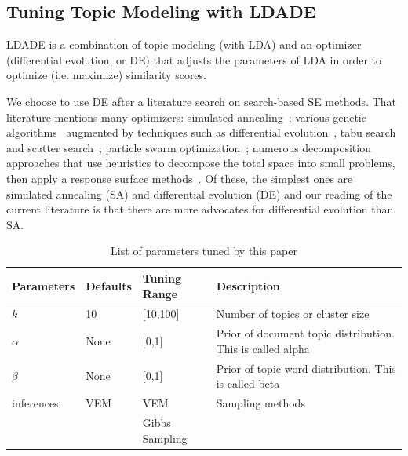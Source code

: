\documentclass[10pt,conference]{IEEEtran}
\theoremstyle{break}
\begin{document}
\subsection{Tuning Topic Modeling with LDADE}
\label{sect: tuning}
LDADE is a combination of topic modeling (with LDA) and an optimizer (differential evolution, or DE) that adjusts
the parameters of LDA in order to optimize (i.e. maximize) similarity scores.

We choose to use DE after a literature search on search-based SE methods.
That literature mentions many optimizers: simulated
annealing~\cite{feather2002converging, menzies2007business}; various genetic
algorithms~\cite{goldberg1979complexity} augmented by techniques such as
differential evolution~\cite{storn1997differential}, tabu search and scatter
search~\cite{glover1986general, beausoleil2006moss, molina2007sspmo,
  nebro2008abyss}; particle swarm optimization~\cite{pan2008particle}; numerous
decomposition approaches that use heuristics to decompose the total space into
small problems, then apply a response surface methods~\cite{krall2015gale,
  zuluaga2013active}. Of these, the simplest ones are simulated annealing (SA)
and differential evolution (DE) and  our reading of the current literature is
that there are more advocates for differential evolution than SA. 

\begin{table}[!htbp]
    \begin{center}
{\scriptsize
\begin{tabular}{|l|l|l|p{3.5cm}|}
        \hline 
        \textbf{Parameters} & \textbf{Defaults} & \textbf{Tuning Range} & \textbf{Description}\\
        \hline
        $k$ & 10 & [10,100] & Number of topics or cluster size \\ 
        \hline
       $\alpha$ & None & [0,1] & Prior of document topic distribution. This is called alpha \\ 
        \hline
        $\beta$ & None & [0,1] & Prior of topic word distribution. This is called  beta \\

        \hline
        inferences  & VEM & VEM    & Sampling methods \\
                  &     & Gibbs Sampling &\\
        \hline
\end{tabular}
}
\end{center}
\caption{List of parameters tuned by this paper}
\label{tb:tuned}
\end{table}
\end{document}
